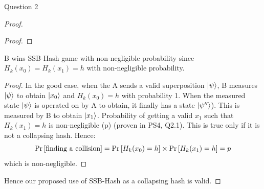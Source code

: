 \begin{solution}{Question 2}
\begin{proof}
\begin{proof}
    \end{proof}
    \begin{claim}
        B wins SSB-Hash game with non-negligible probability since $H_k(x_0) = H_k(x_1) = h$ with non-negligible probability.
    \end{claim}
    \begin{proof}
        In the good case, when the A sends a valid superposition $\ket{\psi}$, B measures $\ket{\psi}$ to obtain $\ket{x_0}$ and $H_k(x_0) = h$ with probability 1. When the measured state $\ket{\psi}$ is operated on by A to obtain, it finally has a state $\ket{\psi''}$). This is measured by B to obtain $\ket{x_1}$. Probability of getting a valid $x_1$ such that $H_k(x_1) = h$ is non-negligible (p) (proven in PS4, Q2.1). This is true only if it is not a collapsing hash. Hence:
        \[\Pr\left[ \text{finding a collision} \right] = \Pr\left[ H_k(x_0) = h \right]\times \Pr\left[ H_k(x_1) = h \right] = p\]
        which is non-negligible.
    \end{proof}

    Hence our proposed use of SSB-Hash as a collapsing hash is valid.
    
    
    \end{proof}
\end{solution}
 
